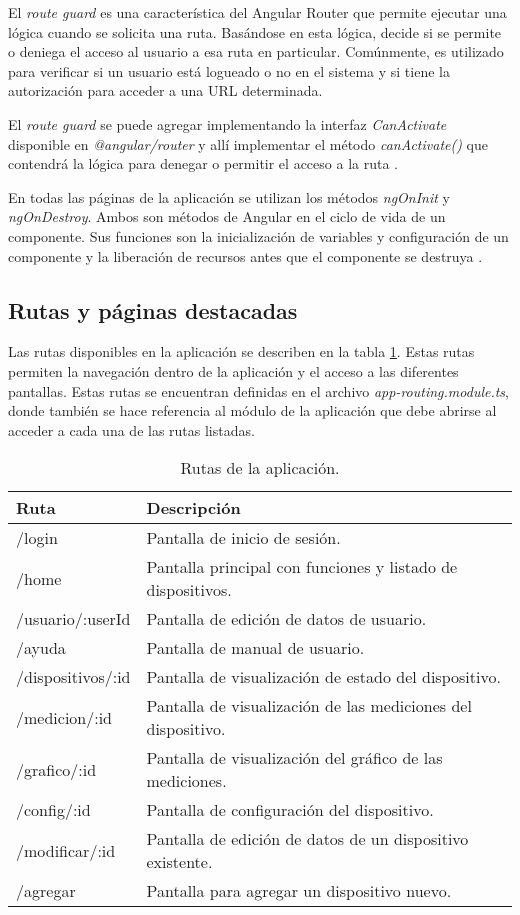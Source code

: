 El \textit{route guard} es una característica del Angular Router que permite ejecutar una lógica cuando se solicita una ruta. Basándose en esta lógica, decide si se permite o deniega el acceso al usuario a esa ruta en particular. Comúnmente, es utilizado para verificar si un usuario está logueado o no en el sistema y si tiene la autorización para acceder a una URL determinada.

El \textit{route guard} se puede agregar implementando la interfaz \textit{CanActivate} disponible en \textit{@angular/router} y allí implementar el método \textit{canActivate()} que contendrá la lógica para denegar o permitir el acceso a la ruta \citep{31}.

En todas las páginas de la aplicación se utilizan los métodos \textit{ngOnInit} y \textit{ngOnDestroy}. Ambos son métodos de Angular en el ciclo de vida de un componente. Sus funciones son la inicialización de variables y configuración de un componente y la liberación de recursos antes que el componente se destruya \citep{32}.

\subsection{Rutas y páginas destacadas}

Las rutas disponibles en la aplicación se describen en la tabla \ref{tab:rutas}. Estas rutas permiten la navegación dentro de la aplicación y el acceso a las diferentes pantallas. Estas rutas se encuentran definidas en el archivo \textit{app-routing.module.ts}, donde también se hace referencia al módulo de la aplicación que debe abrirse al acceder a cada una de las rutas listadas.

\begin{table}[h]
\centering
\caption[Rutas]{Rutas de la aplicación.}
\begin{tabular}{l l}
\toprule
\textbf{Ruta} 			& \textbf{Descripción}\\
\midrule
/login					& Pantalla de inicio de sesión.\\
/home					& Pantalla principal con funciones y listado de dispositivos.\\
/usuario/:userId			& Pantalla de edición de datos de usuario.\\
/ayuda					& Pantalla de manual de usuario.\\
/dispositivos/:id		& Pantalla de visualización de estado del dispositivo.\\
/medicion/:id			& Pantalla de visualización de las mediciones del dispositivo.\\
/grafico/:id				& Pantalla de visualización del gráfico de las mediciones.\\
/config/:id				& Pantalla de configuración del dispositivo.\\
/modificar/:id			& Pantalla de edición de datos de un dispositivo existente.\\
/agregar					& Pantalla para agregar un dispositivo nuevo.\\
\bottomrule
\hline
\end{tabular}
\label{tab:rutas}
\end{table}

